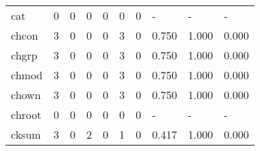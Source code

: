 \begin{longtable}{lp{2.0cm}p{2.0cm}p{2.0cm}p{2.0cm}p{2.0cm}p{2.0cm}p{2.0cm}p{2.0cm}p{2.0cm}}
cat       &                      0 &                                             0 &                                            0 &                                           0 &                                            0 &                                          0 &                                    - &                                      - &                                    - \\
chcon     &                      3 &                                             0 &                                            0 &                                           0 &                                            3 &                                          0 &                                0.750 &                                  1.000 &                                0.000 \\
chgrp     &                      3 &                                             0 &                                            0 &                                           0 &                                            3 &                                          0 &                                0.750 &                                  1.000 &                                0.000 \\
chmod     &                      3 &                                             0 &                                            0 &                                           0 &                                            3 &                                          0 &                                0.750 &                                  1.000 &                                0.000 \\
chown     &                      3 &                                             0 &                                            0 &                                           0 &                                            3 &                                          0 &                                0.750 &                                  1.000 &                                0.000 \\
chroot    &                      0 &                                             0 &                                            0 &                                           0 &                                            0 &                                          0 &                                    - &                                      - &                                    - \\
cksum     &                      3 &                                             0 &                                            2 &                                           0 &                                            1 &                                          0 &                                0.417 &                                  1.000 &                                0.000 \\

\end{longtable}
